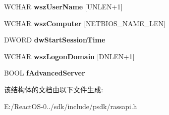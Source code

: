 \begin{DoxyCompactItemize}
W\+C\+H\+AR {\bfseries wsz\+User\+Name} \mbox{[}U\+N\+L\+EN+1\mbox{]}
\item 
\mbox{\label{struct___r_a_s___p_o_r_t__0_a864484002e71cf1ba9bac15b9a0c943f}} 
W\+C\+H\+AR {\bfseries wsz\+Computer} \mbox{[}N\+E\+T\+B\+I\+O\+S\+\_\+\+N\+A\+M\+E\+\_\+\+L\+EN\mbox{]}
\item 
\mbox{\label{struct___r_a_s___p_o_r_t__0_a23fae8f3006edae21680956dea9c9ba0}} 
D\+W\+O\+RD {\bfseries dw\+Start\+Session\+Time}
\item 
\mbox{\label{struct___r_a_s___p_o_r_t__0_a33bf27a3a06a2d6c34de872e5d37c76f}} 
W\+C\+H\+AR {\bfseries wsz\+Logon\+Domain} \mbox{[}D\+N\+L\+EN+1\mbox{]}
\item 
\mbox{\label{struct___r_a_s___p_o_r_t__0_a6847d6b3cb90ab7f4bc3c57ab1b62f66}} 
B\+O\+OL {\bfseries f\+Advanced\+Server}
\end{DoxyCompactItemize}


该结构体的文档由以下文件生成\+:\begin{DoxyCompactItemize}
\item 
E\+:/\+React\+O\+S-\/0../sdk/include/psdk/rassapi.\+h\end{DoxyCompactItemize}
